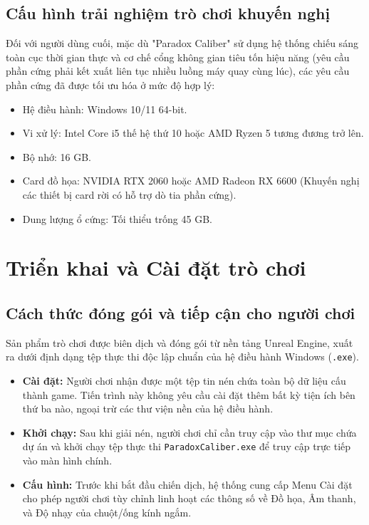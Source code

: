 \documentclass[../DoAn.tex]{subfiles}
\begin{document}
\subsection{Cấu hình trải nghiệm trò chơi khuyến nghị}
Đối với người dùng cuối, mặc dù "Paradox Caliber" sử dụng hệ thống chiếu sáng toàn cục thời gian thực và cơ chế cổng không gian tiêu tốn hiệu năng (yêu cầu phần cứng phải kết xuất liên tục nhiều luồng máy quay cùng lúc), các yêu cầu phần cứng đã được tối ưu hóa ở mức độ hợp lý:
\begin{itemize}
    \item Hệ điều hành: Windows 10/11 64-bit.
    \item Vi xử lý: Intel Core i5 thế hệ thứ 10 hoặc AMD Ryzen 5 tương đương trở lên.
    \item Bộ nhớ: 16 GB.
    \item Card đồ họa: NVIDIA RTX 2060 hoặc AMD Radeon RX 6600 (Khuyến nghị các thiết bị card rời có hỗ trợ dò tia phần cứng).
    \item Dung lượng ổ cứng: Tối thiểu trống 45 GB.
\end{itemize}

\section{Triển khai và Cài đặt trò chơi}
\subsection{Cách thức đóng gói và tiếp cận cho người chơi}
Sản phẩm trò chơi được biên dịch và đóng gói từ nền tảng Unreal Engine, xuất ra dưới định dạng tệp thực thi độc lập chuẩn của hệ điều hành Windows (\texttt{.exe}).
\begin{itemize}
    \item \textbf{Cài đặt:} Người chơi nhận được một tệp tin nén chứa toàn bộ dữ liệu cấu thành game. Tiến trình này không yêu cầu cài đặt thêm bất kỳ tiện ích bên thứ ba nào, ngoại trừ các thư viện nền của hệ điều hành.
    \item \textbf{Khởi chạy:} Sau khi giải nén, người chơi chỉ cần truy cập vào thư mục chứa dự án và khởi chạy tệp thực thi \texttt{ParadoxCaliber.exe} để truy cập trực tiếp vào màn hình chính.
    \item \textbf{Cấu hình:} Trước khi bắt đầu chiến dịch, hệ thống cung cấp Menu Cài đặt cho phép người chơi tùy chỉnh linh hoạt các thông số về Đồ họa, Âm thanh, và Độ nhạy của chuột/ống kính ngắm.
\end{itemize}
\end{document}

